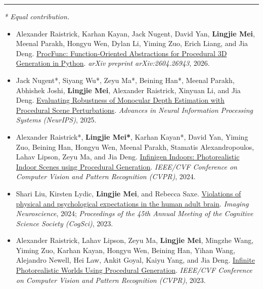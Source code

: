 \documentclass[10pt]{article}
\newcommand{\mysection}[1]{\vspace{4pt}\noindent{\large\bfseries #1}\par\vspace{-2pt}\hrule\vspace{3pt}}
\begin{document}
\mysection{PUBLICATIONS}
\textit{* Equal contribution.}
\begin{itemize}
    \item Alexander Raistrick, Karhan Kayan, Jack Nugent, David Yan, \textbf{Lingjie Mei}, Meenal Parakh, Hongyu Wen, Dylan Li, Yiming Zuo, Erich Liang, and Jia Deng.
    \href{https://arxiv.org/abs/2604.26943}{ProcFunc: Function-Oriented Abstractions for Procedural 3D Generation in Python}.
    \textit{arXiv preprint arXiv:2604.26943}, 2026.

    \item Jack Nugent*, Siyang Wu*, Zeyu Ma*, Beining Han*, Meenal Parakh, Abhishek Joshi, \textbf{Lingjie Mei}, Alexander Raistrick, Xinyuan Li, and Jia Deng.
    \href{https://arxiv.org/abs/2507.00981}{Evaluating Robustness of Monocular Depth Estimation with Procedural Scene Perturbations}.
    \textit{Advances in Neural Information Processing Systems (NeurIPS)}, 2025.

    \item Alexander Raistrick*, \textbf{Lingjie Mei*}, Karhan Kayan*, David Yan, Yiming Zuo, Beining Han, Hongyu Wen, Meenal Parakh, Stamatis Alexandropoulos, Lahav Lipson, Zeyu Ma, and Jia Deng.
    \href{https://openaccess.thecvf.com/content/CVPR2024/html/Raistrick_Infinigen_Indoors_Photorealistic_Indoor_Scenes_using_Procedural_Generation_CVPR_2024_paper.html}{Infinigen Indoors: Photorealistic Indoor Scenes using Procedural Generation}.
    \textit{IEEE/CVF Conference on Computer Vision and Pattern Recognition (CVPR)}, 2024.

    \item Shari Liu, Kirsten Lydic, \textbf{Lingjie Mei}, and Rebecca Saxe.
    \href{https://direct.mit.edu/imag/article/doi/10.1162/imag_a_00068/118940}{Violations of physical and psychological expectations in the human adult brain}.
    \textit{Imaging Neuroscience}, 2024; \textit{Proceedings of the 45th Annual Meeting of the Cognitive Science Society (CogSci)}, 2023.

    \item Alexander Raistrick, Lahav Lipson, Zeyu Ma, \textbf{Lingjie Mei}, Mingzhe Wang, Yiming Zuo, Karhan Kayan, Hongyu Wen, Beining Han, Yihan Wang, Alejandro Newell, Hei Law, Ankit Goyal, Kaiyu Yang, and Jia Deng.
    \href{https://openaccess.thecvf.com/content/CVPR2023/html/Raistrick_Infinite_Photorealistic_Worlds_Using_Procedural_Generation_CVPR_2023_paper.html}{Infinite Photorealistic Worlds Using Procedural Generation}.
    \textit{IEEE/CVF Conference on Computer Vision and Pattern Recognition (CVPR)}, 2023.


\end{itemize}
\end{document}
